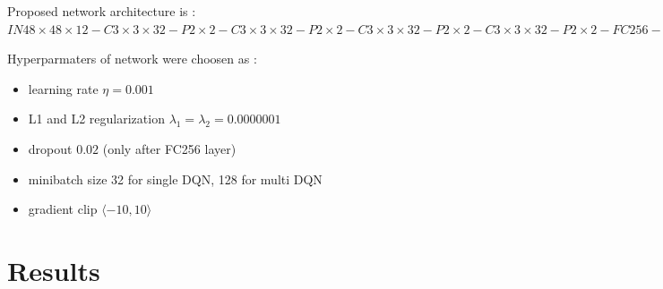 \documentclass[10pt,a4paper]{article}
\begin{document}
Proposed network architecture is : \\
$IN48\times 48\times 12 - C3\times 3\times 32 - P2\times 2 - C3\times 3\times 32 - P2\times 2 - C3\times 3\times 32 - P2\times 2 - C3\times 3\times 32 - P2\times 2 - FC256 - FC_{actions}$

Hyperparmaters of network were choosen as :
\begin{itemize}
    \item learning rate $\eta = 0.001$
    \item L1 and L2 regularization $\lambda _1 = \lambda _2 = 0.0000001$
    \item dropout $0.02$ (only after FC256 layer)
    \item minibatch size 32 for single DQN, 128 for multi DQN
    \item gradient clip $\langle -10, 10 \rangle$
\end{itemize}

\newpage
\section{Results}
\end{document}
